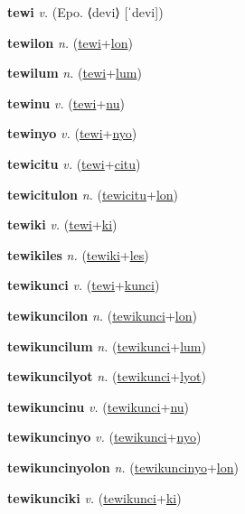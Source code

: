 \textbf{\hypertarget{tewi}{tewi}} \textit{v.} (Epo. ⟨devi⟩ [ˈdevi])


\textbf{\hypertarget{tewilon}{tewilon}} \textit{n.} (\hyperlink{tewi}{tewi}+\allowbreak \hyperlink{lon}{lon})


\textbf{\hypertarget{tewilum}{tewilum}} \textit{n.} (\hyperlink{tewi}{tewi}+\allowbreak \hyperlink{lum}{lum})


\textbf{\hypertarget{tewinu}{tewinu}} \textit{v.} (\hyperlink{tewi}{tewi}+\allowbreak \hyperlink{nu}{nu})


\textbf{\hypertarget{tewinyo}{tewinyo}} \textit{v.} (\hyperlink{tewi}{tewi}+\allowbreak \hyperlink{nyo}{nyo})


\textbf{\hypertarget{tewicitu}{tewicitu}} \textit{v.} (\hyperlink{tewi}{tewi}+\allowbreak \hyperlink{citu}{citu})


\textbf{\hypertarget{tewicitulon}{tewicitulon}} \textit{n.} (\hyperlink{tewicitu}{tewicitu}+\allowbreak \hyperlink{lon}{lon})


\textbf{\hypertarget{tewiki}{tewiki}} \textit{v.} (\hyperlink{tewi}{tewi}+\allowbreak \hyperlink{ki}{ki})


\textbf{\hypertarget{tewikiles}{tewikiles}} \textit{n.} (\hyperlink{tewiki}{tewiki}+\allowbreak \hyperlink{les}{les})


\textbf{\hypertarget{tewikunci}{tewikunci}} \textit{v.} (\hyperlink{tewi}{tewi}+\allowbreak \hyperlink{kunci}{kunci})


\textbf{\hypertarget{tewikuncilon}{tewikuncilon}} \textit{n.} (\hyperlink{tewikunci}{tewikunci}+\allowbreak \hyperlink{lon}{lon})


\textbf{\hypertarget{tewikuncilum}{tewikuncilum}} \textit{n.} (\hyperlink{tewikunci}{tewikunci}+\allowbreak \hyperlink{lum}{lum})


\textbf{\hypertarget{tewikuncilyot}{tewikuncilyot}} \textit{n.} (\hyperlink{tewikunci}{tewikunci}+\allowbreak \hyperlink{lyot}{lyot})


\textbf{\hypertarget{tewikuncinu}{tewikuncinu}} \textit{v.} (\hyperlink{tewikunci}{tewikunci}+\allowbreak \hyperlink{nu}{nu})


\textbf{\hypertarget{tewikuncinyo}{tewikuncinyo}} \textit{v.} (\hyperlink{tewikunci}{tewikunci}+\allowbreak \hyperlink{nyo}{nyo})


\textbf{\hypertarget{tewikuncinyolon}{tewikuncinyolon}} \textit{n.} (\hyperlink{tewikuncinyo}{tewikuncinyo}+\allowbreak \hyperlink{lon}{lon})


\textbf{\hypertarget{tewikunciki}{tewikunciki}} \textit{v.} (\hyperlink{tewikunci}{tewikunci}+\allowbreak \hyperlink{ki}{ki})


